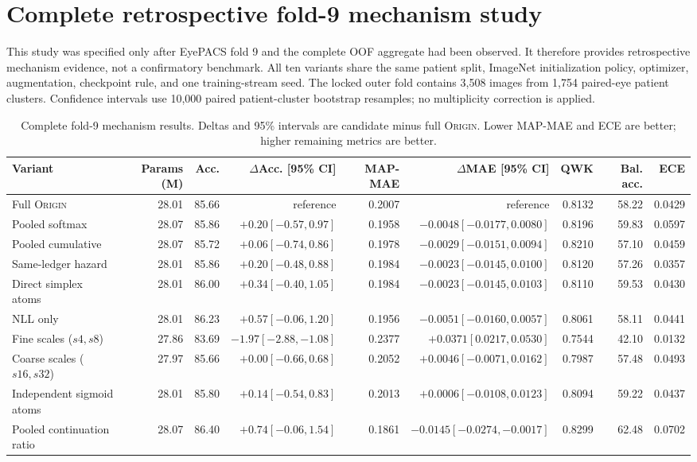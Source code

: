 \documentclass[10pt,twocolumn,letterpaper]{article}
\newcommand{\method}{\textsc{Origin}\xspace}
\begin{document}
\section{Complete retrospective fold-9 mechanism study}
\label{sec:ablation}

This study was specified only after EyePACS fold 9 and the complete OOF
aggregate had been observed.  It therefore provides retrospective mechanism
evidence, not a confirmatory benchmark.  All ten variants share the same
patient split, ImageNet initialization policy, optimizer, augmentation,
checkpoint rule, and one training-stream seed.  The locked outer fold contains
3,508 images from 1,754 paired-eye patient clusters.  Confidence intervals use
10,000 paired patient-cluster bootstrap resamples; no multiplicity correction
is applied.

\begin{table}[t]
  \centering
  \caption{Complete fold-9 mechanism results.  Deltas and 95\% intervals are
  candidate minus full \method.  Lower MAP-MAE and ECE are better; higher
  remaining metrics are better.}
  \label{tab:ablation-full}
  \scriptsize
  \setlength{\tabcolsep}{3.2pt}
  \begin{tabular}{@{}lrrrrrrrr@{}}
    \toprule
    Variant & Params (M) & Acc. & $\Delta$Acc. [95\% CI] & MAP-MAE & $\Delta$MAE [95\% CI] & QWK & Bal. acc. & ECE \\
    \midrule
    Full \method & 28.01 & 85.66 & reference & 0.2007 & reference & 0.8132 & 58.22 & 0.0429 \\
    Pooled softmax & 28.07 & 85.86 & $+0.20[-0.57,0.97]$ & 0.1958 & $-0.0048[-0.0177,0.0080]$ & 0.8196 & 59.83 & 0.0597 \\
    Pooled cumulative & 28.07 & 85.72 & $+0.06[-0.74,0.86]$ & 0.1978 & $-0.0029[-0.0151,0.0094]$ & 0.8210 & 57.10 & 0.0459 \\
    Same-ledger hazard & 28.01 & 85.86 & $+0.20[-0.48,0.88]$ & 0.1984 & $-0.0023[-0.0145,0.0100]$ & 0.8120 & 57.26 & 0.0357 \\
    Direct simplex atoms & 28.01 & 86.00 & $+0.34[-0.40,1.05]$ & 0.1984 & $-0.0023[-0.0145,0.0103]$ & 0.8110 & 59.53 & 0.0430 \\
    NLL only & 28.01 & 86.23 & $+0.57[-0.06,1.20]$ & 0.1956 & $-0.0051[-0.0160,0.0057]$ & 0.8061 & 58.11 & 0.0441 \\
    Fine scales ($s4,s8$) & 27.86 & 83.69 & $-1.97[-2.88,-1.08]$ & 0.2377 & $+0.0371[0.0217,0.0530]$ & 0.7544 & 42.10 & 0.0132 \\
    Coarse scales ($s16,s32$) & 27.97 & 85.66 & $+0.00[-0.66,0.68]$ & 0.2052 & $+0.0046[-0.0071,0.0162]$ & 0.7987 & 57.48 & 0.0493 \\
    Independent sigmoid atoms & 28.01 & 85.80 & $+0.14[-0.54,0.83]$ & 0.2013 & $+0.0006[-0.0108,0.0123]$ & 0.8094 & 59.22 & 0.0437 \\
    Pooled continuation ratio & 28.07 & 86.40 & $+0.74[-0.06,1.54]$ & 0.1861 & $-0.0145[-0.0274,-0.0017]$ & 0.8299 & 62.48 & 0.0702 \\
    \bottomrule
  \end{tabular}
\end{table}
\end{document}
